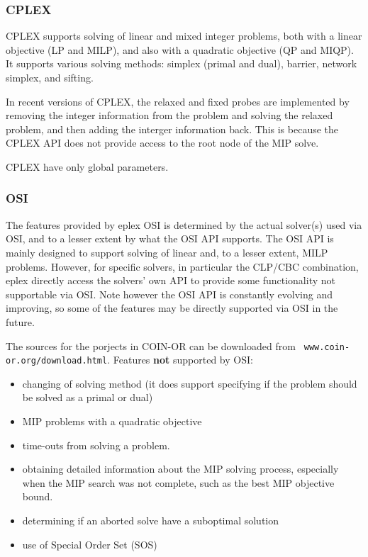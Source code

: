 \subsubsection{CPLEX}
CPLEX supports solving of linear and mixed integer problems, both with a
linear objective (LP and MILP), and also with a quadratic objective (QP and
MIQP). It supports various solving methods: simplex (primal and dual),
barrier, network simplex, and sifting. 

In recent versions of CPLEX, the relaxed and fixed probes are implemented 
by removing
the integer information from the problem and solving the relaxed problem,
and then adding the interger information back. This is because the CPLEX
API does not provide access to the root node of the MIP solve.

CPLEX have only global parameters.
  
\subsubsection{OSI}
The features provided by eplex OSI is determined by the actual
solver(s) used via OSI, and to a lesser extent by what the OSI API
supports. The OSI API is mainly designed to support solving of 
linear and, to a lesser extent, MILP problems. However, for specific
solvers, in particular the CLP/CBC combination, eplex
directly access the solvers' own API to provide some functionality not
supportable via OSI. Note however the OSI API is constantly evolving and
improving, so some of the features may be directly supported via OSI in the
future. 

The sources for the porjects in COIN-OR can be downloaded from {\tt
www.coin-or.org/download.html}. 
Features {\bf not} supported by OSI: 
\begin{itemize}
\item changing of solving method (it does support specifying if the problem
should be solved as a primal or dual)
\item MIP problems with a quadratic objective
\item time-outs from solving a problem.
\item obtaining detailed information about the MIP solving process,
especially when the MIP search was not complete, such as
the best MIP objective bound.
\item determining if an aborted solve have a suboptimal solution 
\item use of Special Order Set (SOS)
\end{itemize}


